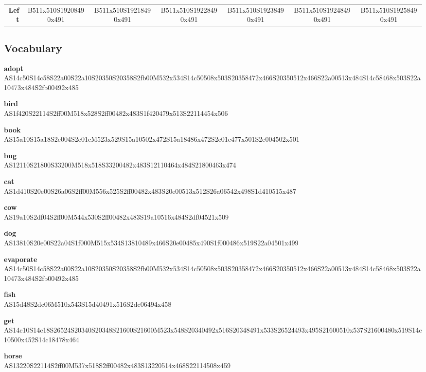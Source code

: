 \documentclass{article}
\begin{document}
\begin{center}
\begin{tabular}{r*{6}{c}}
\textbf{Left}&
B511x510S19208490x491&
B511x510S19218490x491&
B511x510S19228490x491&
B511x510S19238490x491&
B511x510S19248490x491&
B511x510S19258490x491\\
\end{tabular}
\end{center}

\subsection{Vocabulary}

\begin{glossary}

\textbf{adopt}\\
AS14c50S14c58S22a00S22a10S20350S20358S2fb00M532x534S14c50508x503S20358472x466S20350512x466S22a00513x484S14c58468x503S22a10473x484S2fb00492x485

\textbf{bird}\\
AS1f420S22114S2ff00M518x528S2ff00482x483S1f420479x513S22114454x506

\textbf{book}\\
AS15a10S15a18S2e004S2e01cM523x529S15a10502x472S15a18486x472S2e01c477x501S2e004502x501

\textbf{bug}\\
AS12110S21800S33200M518x518S33200482x483S12110464x484S21800463x474

\textbf{cat}\\
AS1d410S20e00S26a06S2ff00M556x525S2ff00482x483S20e00513x512S26a06542x498S1d410515x487

\textbf{cow}\\
AS19a10S2df04S2ff00M544x530S2ff00482x483S19a10516x484S2df04521x509

\textbf{dog}\\
AS13810S20e00S22a04S1f000M515x534S13810489x466S20e00485x490S1f000486x519S22a04501x499

\textbf{evaporate}\\
AS14c50S14c58S22a00S22a10S20350S20358S2fb00M532x534S14c50508x503S20358472x466S20350512x466S22a00513x484S14c58468x503S22a10473x484S2fb00492x485

\textbf{fish}\\
AS15d48S2dc06M510x543S15d40491x516S2dc06494x458

\textbf{get}\\
AS14c10S14c18S26524S20340S20348S21600S21600M523x548S20340492x516S20348491x533S26524493x495S21600510x537S21600480x519S14c10500x452S14c18478x464

\textbf{horse}\\
AS13220S22114S2ff00M537x518S2ff00482x483S13220514x468S22114508x459


\end{glossary}
\end{document}
